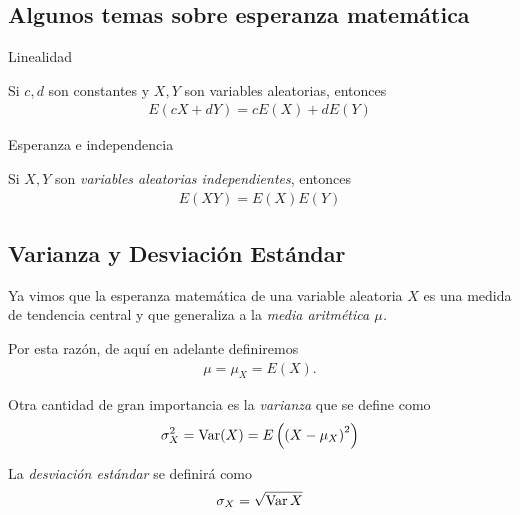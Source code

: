 \subsection{Algunos temas sobre esperanza matemática}
{Linealidad}
 \begin{teorema}
  \label{thm:2.9.1}
  Si $c,d$ son constantes y $X,Y$ son variables aleatorias, entonces
  \begin{align}
   \label{eq:2.9.7}
   E\left( cX+dY \right)=
   cE\left( X \right)+dE\left( Y \right)
  \end{align}

 \end{teorema}


{Esperanza e independencia}
 \begin{teorema}
  \label{thm:2.9.2} Si $X,Y$ son \emph{variables aleatorias independientes}, entonces
  \begin{align}
   \label{eq:2.9.8}
   E\left( XY \right)=E(X)E(Y)
  \end{align}

 \end{teorema}



\subsection{Varianza y Desviación Estándar}

 Ya vimos que la esperanza matemática de una variable aleatoria $X$ es una medida de tendencia central y que generaliza a la \emph{media aritmética $\mu$.}
 

\begin{observacion}
 Por esta razón, de aquí en adelante definiremos
 \begin{align}
  \mu=\mu_{X}=E(X).
 \end{align}

\end{observacion}

 


 Otra cantidad de gran importancia es la \emph{varianza} que se define como
 \begin{align}
  \label{eq:2.9.9}
  \sigma_{X}^{2}=\operatorname{Var}(X)=E\left( \left( X-\mu_{X} \right)^{2} \right)
 \end{align}



 La \emph{desviación estándar} se definirá como
 \begin{align}
  \label{eq:2.9.10}
  \sigma_{X} = \sqrt{\operatorname{Var}{X}}
 \end{align}



